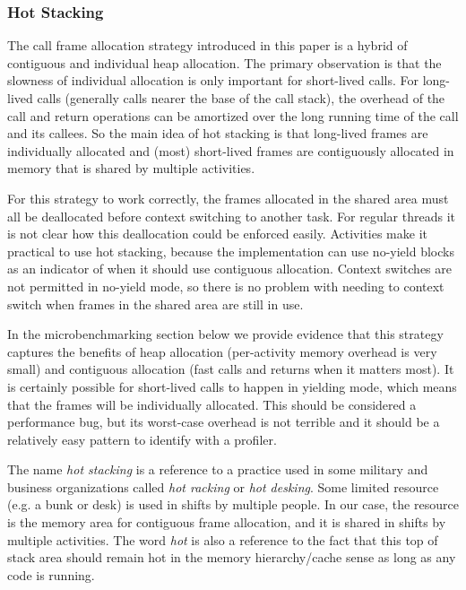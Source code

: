 \documentclass[9pt,preprint]{sigplanconf-2}
\begin{document}
\subsubsection{Hot Stacking}

The call frame allocation strategy introduced in this paper is a hybrid of contiguous and individual heap allocation.
The primary observation is that the slowness of individual allocation is only important for short-lived calls.
For long-lived calls (generally calls nearer the base of the call stack), the overhead of the call and return operations can be amortized over the long running time of the call and its callees.
So the main idea of hot stacking is that long-lived frames are individually allocated and (most) short-lived frames are contiguously allocated in memory that is shared by multiple activities.

For this strategy to work correctly, the frames allocated in the shared area must all be deallocated before context switching to another task.
For regular threads it is not clear how this deallocation could be enforced easily.
Activities make it practical to use hot stacking, because the implementation can use no-yield blocks as an indicator of when it should use contiguous allocation.
Context switches are not permitted in no-yield mode, so there is no problem with needing to context switch when frames in the shared area are still in use.

In the microbenchmarking section below we provide evidence that this strategy captures the benefits of heap allocation (per-activity memory overhead is very small) and contiguous allocation (fast calls and returns when it matters most).
It is certainly possible for short-lived calls to happen in yielding mode, which means that the frames will be individually allocated.
This should be considered a performance bug, but its worst-case overhead is not terrible and it should be a relatively easy pattern to identify with a profiler.

The name \emph{hot stacking} is a reference to a practice used in some military and business organizations called \emph{hot racking} or \emph{hot desking}.
Some limited resource (e.g. a bunk or desk) is used in shifts by multiple people.
In our case, the resource is the memory area for contiguous frame allocation, and it is shared in shifts by multiple activities.
The word \emph{hot} is also a reference to the fact that this top of stack area should remain hot in the memory hierarchy/cache sense as long as any code is running.
\end{document}
